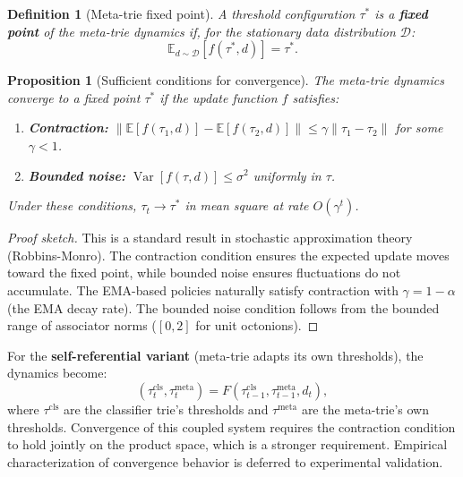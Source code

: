 \documentclass[11pt,a4paper]{article}
\newtheorem{definition}[theorem]{Definition}
\newtheorem{proposition}[theorem]{Proposition}
\theoremstyle{definition}
\theoremstyle{remark}
\DeclareMathOperator{\Var}{Var}
\begin{document}
\begin{definition}[Meta-trie fixed point]
A threshold configuration $\tau^*$ is a \textbf{fixed point} of the meta-trie dynamics if, for the stationary data distribution $\mathcal{D}$:
\begin{equation}
  \mathbb{E}_{d \sim \mathcal{D}}[f(\tau^*, d)] = \tau^*.
\end{equation}
\end{definition}

\begin{proposition}[Sufficient conditions for convergence]
\label{prop:convergence}
The meta-trie dynamics converge to a fixed point $\tau^*$ if the update function $f$ satisfies:
\begin{enumerate}[nosep]
  \item \textbf{Contraction:} $\lVert \mathbb{E}[f(\tau_1, d)] - \mathbb{E}[f(\tau_2, d)] \rVert \leq \gamma \lVert \tau_1 - \tau_2 \rVert$ for some $\gamma < 1$.
  \item \textbf{Bounded noise:} $\Var[f(\tau, d)] \leq \sigma^2$ uniformly in $\tau$.
\end{enumerate}
Under these conditions, $\tau_t \to \tau^*$ in mean square at rate $O(\gamma^t)$.
\end{proposition}

\begin{proof}[Proof sketch]
This is a standard result in stochastic approximation theory (Robbins-Monro). The contraction condition ensures the expected update moves toward the fixed point, while bounded noise ensures fluctuations do not accumulate. The EMA-based policies naturally satisfy contraction with $\gamma = 1 - \alpha$ (the EMA decay rate). The bounded noise condition follows from the bounded range of associator norms ($[0, 2]$ for unit octonions).
\end{proof}

For the \textbf{self-referential variant} (meta-trie adapts its own thresholds), the dynamics become:
\begin{equation}
  (\tau_t^{\text{cls}}, \tau_t^{\text{meta}}) = F(\tau_{t-1}^{\text{cls}}, \tau_{t-1}^{\text{meta}}, d_t),
\end{equation}
where $\tau^{\text{cls}}$ are the classifier trie's thresholds and $\tau^{\text{meta}}$ are the meta-trie's own thresholds. Convergence of this coupled system requires the contraction condition to hold jointly on the product space, which is a stronger requirement. Empirical characterization of convergence behavior is deferred to experimental validation.
\end{document}
